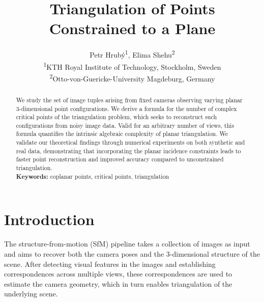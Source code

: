 \documentclass{article}
\begin{document}
\title{Triangulation of Points Constrained to a Plane}

\author{
\large Petr Hrubý\textsuperscript{1}, Elima Shehu\textsuperscript{2} \\[0.5em]
\small
\textsuperscript{1}KTH Royal Institute of Technology, Stockholm, Sweden\\
\small
\textsuperscript{2}Otto-von-Guericke-University Magdeburg, Germany
}

\maketitle

\begin{abstract}
We study the set of image tuples arising from fixed cameras observing varying planar 3-dimensional point configurations. We derive a formula for the number of complex critical points of the triangulation problem, which seeks to reconstruct such configurations from noisy image data. Valid for an arbitrary number of views, this formula quantifies the intrinsic algebraic complexity of planar triangulation. We validate our theoretical findings through numerical experiments on both synthetic and real data, demonstrating that incorporating the planar incidence constraints leads to faster point reconstruction and improved accuracy compared to unconstrained triangulation.
\medskip
\\
\noindent\textbf{Keywords:} coplanar points, critical points, triangulation
\end{abstract}


\section{Introduction}
\label{sec:intro}

The structure-from-motion (SfM) pipeline takes a collection of images as input and aims to recover both the camera poses and the 3-dimensional structure of the scene. After detecting visual features in the images and establishing correspondences across multiple views, these correspondences are used to estimate the camera geometry, which in turn enables triangulation of the underlying scene.
\end{document}
